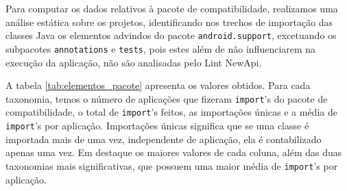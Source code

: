 Para computar os dados relativos à pacote de compatibilidade, realizamos uma análise
estática sobre os projetos, identificando nos trechos de importação das classes Java
os elementos advindos do pacote \texttt{android.support}, excetuando os subpacotes
\texttt{annotations} e \texttt{tests}, pois estes além de não influenciarem na execução
da aplicação, não são analisadas pelo Lint NewApi.

A tabela \ref{tab:elementos_pacote} apresenta os valores obtidos. Para cada taxonomia,
temos o número de aplicações que fizeram \texttt{import}’s do pacote de compatibilidade,
o total de \texttt{import}’s feitos, as importações únicas e a média de \texttt{import}’s 
por aplicação. Importações únicas significa que se uma classe é importada mais de uma vez, 
independente de aplicação, ela é contabilizado apenas uma vez. Em destaque os maiores 
valores de cada coluna, além das duas taxonomias mais significativas, que possuem uma
 maior média de \texttt{import}’s por aplicação.

